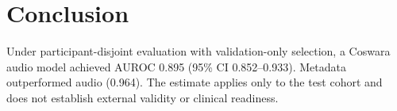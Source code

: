 \documentclass[conference]{IEEEtran}
\begin{document}
\section{Conclusion}

Under participant-disjoint evaluation with validation-only selection, a Coswara audio model achieved AUROC 0.895 (95\% CI 0.852--0.933). Metadata outperformed audio (0.964). The estimate applies only to the test cohort and does not establish external validity or clinical readiness.



\end{document}
